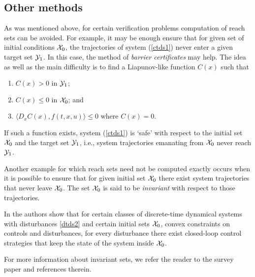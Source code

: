 \subsection{Other methods}\label{subsec_othermethods}
As was mentioned above, for certain verification problems computation
of reach sets can be avoided.
For example,
it may be enough ensure that for given set of initial conditions $\XX_0$,
the trajectories of system (\ref{ctds1}) never enter a given target set $\YY_1$.
In this case, the method of \emph{barrier certificates} \cite{prajna06}
may help.
The idea as well as the main difficulty is to find a Liapunov-like function
$C(x)$ such that
\begin{enumerate}
\item $C(x)>0$ in $\YY_1$;
\item $C(x)\leq0$ in $\XX_0$; and
\item $\langle D_xC(x), f(t, x, u)\rangle\leq0$ where $C(x)=0$.
\end{enumerate}
If such a function exists, system (\ref{ctds1}) is `safe' with respect to
the initial set $\XX_0$ and the target set $\YY_1$, i.e.,
system trajectories emanating from $\XX_0$ never reach $\YY_1$.

Another example for which reach sets need not be computed exactly occurs when
it is possible to ensure that for given initial set $\XX_0$ there
exist system trajectories that never leave $\XX_0$.
The set $\XX_0$ is said to be \emph{invariant} with respect
to those trajectories.

In \cite{racovic08} the authors show that for certain classes of
discrete-time dynamical systems with disturbances \ref{dtds2} and
certain initial sets $\XX_0$, convex constraints on controls and disturbances,
for every disturbance there exist closed-loop control strategies that 
keep the state of the system inside $\XX_0$.

For more information about invariant sets, we refer the reader to
the survey paper \cite{blanchini99} and references therein.



